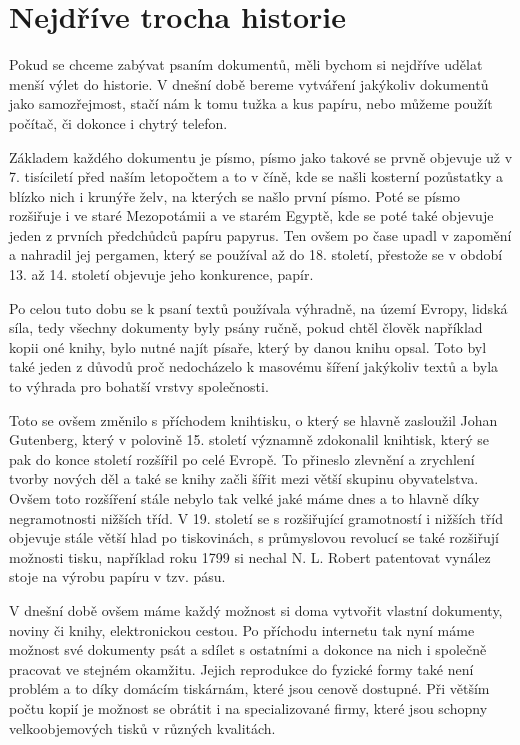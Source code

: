 \section{Nejdříve trocha historie}

Pokud se chceme zabývat psaním dokumentů, měli bychom si nejdříve udělat menší výlet do historie. V dnešní době bereme vytváření
jakýkoliv dokumentů jako samozřejmost, stačí nám k tomu tužka a kus papíru, nebo můžeme použít počítač, či dokonce i chytrý telefon.

Základem každého dokumentu je písmo, písmo jako takové se prvně objevuje už v 7. tisíciletí před naším letopočtem a to v číně,
kde se našli kosterní pozůstatky a blízko nich i krunýře želv, na kterých se našlo první písmo. \cite{EarliestWriting} Poté se písmo rozšiřuje
i ve staré Mezopotámii a ve starém Egyptě, kde se poté také objevuje jeden z prvních předchůdců papíru papyrus. Ten ovšem po čase upadl
v zapomění a nahradil jej pergamen, který se používal až do 18. století, přestože se v období 13. až 14. století objevuje jeho konkurence, papír.

Po celou tuto dobu se k psaní textů používala výhradně, na území Evropy, lidská síla, tedy všechny dokumenty byly psány ručně, pokud chtěl člověk například
kopii oné knihy, bylo nutné najít písaře, který by danou knihu opsal. Toto byl také jeden z důvodů proč nedocházelo k masovému šíření jakýkoliv textů a byla
to výhrada pro bohatší vrstvy společnosti.

Toto se ovšem změnilo s příchodem knihtisku, o který se hlavně zasloužil Johan Gutenberg, který v polovině 15. století významně zdokonalil knihtisk,
který se pak do konce století rozšířil po celé Evropě. To přineslo zlevnění a zrychlení tvorby nových děl a také se knihy začli šířit mezi větší skupinu
obyvatelstva. Ovšem toto rozšíření stále nebylo tak velké jaké máme dnes a to hlavně díky negramotnosti nižších tříd. V 19. století se s rozšiřující gramotností
i nižších tříd objevuje stále větší hlad po tiskovinách, s průmyslovou revolucí se také rozšiřují možnosti tisku, například roku 1799 si nechal N. L. Robert
patentovat vynález stoje na výrobu papíru v tzv.  pásu. \cite{Papir}

V dnešní době ovšem máme každý možnost si doma vytvořit vlastní dokumenty, noviny či knihy, elektronickou cestou. Po příchodu internetu tak nyní máme možnost
své dokumenty psát a sdílet s ostatními a dokonce na nich i společně pracovat ve stejném okamžitu. Jejich reprodukce do fyzické formy také není problém a to díky
domácím tiskárnám, které jsou cenově dostupné. Při větším počtu kopií je možnost se obrátit i na specializované firmy, které jsou schopny velkoobjemových tisků
v různých kvalitách.

